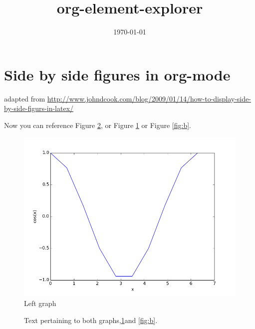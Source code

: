 \documentclass[11pt]{article}
\date{\today}
\title{org-element-explorer}
\begin{document}
\section{Side by side figures in org-mode}
\label{sec-1}
adapted from \url{http://www.johndcook.com/blog/2009/01/14/how-to-display-side-by-side-figurs-in-latex/}


Now you can reference Figure \ref{fig12}, or Figure \ref{fig:a} or Figure \ref{fig:b}.

\begin{figure}[htb]
\centering
\includegraphics[width=.9\linewidth]{./images/cos-plot.png}
\caption{Left graph \label{fig:a}}
\end{figure}




\begin{figure}
\enskip %
\caption{Text pertaining to both graphs,\ref{fig:a}and \ref{fig:b}. \label{fig12}}
\end{figure}
\end{document}

